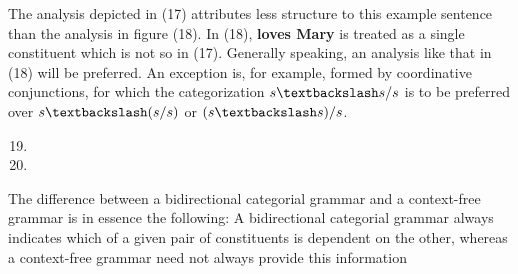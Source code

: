\documentclass[11pt]{article}
\begin{document}
The analysis depicted in (17) attributes less structure to this example
sentence than the analysis in figure (18). In (18), \textbf{loves Mary} is treated as
a single constituent which is not so in (17). Generally speaking, an
analysis like that in (18) will be preferred. An exception is, for example,
formed by coordinative conjunctions, for which the categorization
\(s\textbackslash s/s\) is to be preferred over \(s\textbackslash(s/s)\) or
\((s\textbackslash s)/s\).
\begin{enumerate}
\setcounter{enumi}{18}
\item {}
\item {}
\end{enumerate}



The difference between a bidirectional categorial grammar and a context-free
grammar is in essence the following: A bidirectional categorial grammar
always indicates which of a given pair of constituents is dependent on the
other, whereas a context-free grammar need not always provide this information
\end{document}
